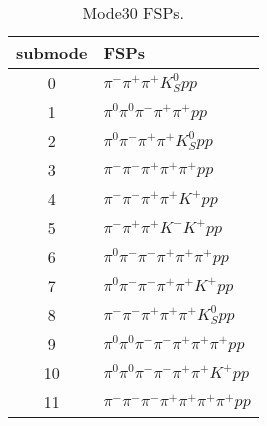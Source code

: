 \begin{table}[h!]
\begin{center}
\begin{tabular}{cl}
\hline
submode& FSPs\\
\hline
0 & $\pi^- \pi^+ \pi^+ K_S^0 {p} p $ \\
1 & $\pi^0 \pi^0 \pi^- \pi^+ \pi^+ {p} p $ \\
2 & $\pi^0 \pi^- \pi^+ \pi^+ K_S^0 {p} p $ \\
3 & $\pi^- \pi^- \pi^+ \pi^+ \pi^+ {p} p $ \\
4 & $\pi^- \pi^- \pi^+ \pi^+ K^+ {p} p $ \\
5 & $\pi^- \pi^+ \pi^+ K^- K^+ {p} p $ \\
6 & $\pi^0 \pi^- \pi^- \pi^+ \pi^+ \pi^+ {p} p $ \\
7 & $\pi^0 \pi^- \pi^- \pi^+ \pi^+ K^+ {p} p $ \\
8 & $\pi^- \pi^- \pi^+ \pi^+ \pi^+ K_S^0 {p} p $ \\
9 & $\pi^0 \pi^0 \pi^- \pi^- \pi^+ \pi^+ \pi^+ {p} p $ \\
10 & $\pi^0 \pi^0 \pi^- \pi^- \pi^+ \pi^+ K^+ {p} p $ \\
11 & $\pi^- \pi^- \pi^- \pi^+ \pi^+ \pi^+ \pi^+ {p} p $ \\
\hline
\end{tabular}
\label{tab:Mode30FSPs}
\caption{Mode30 FSPs.}
\end{center}
\end{table}
